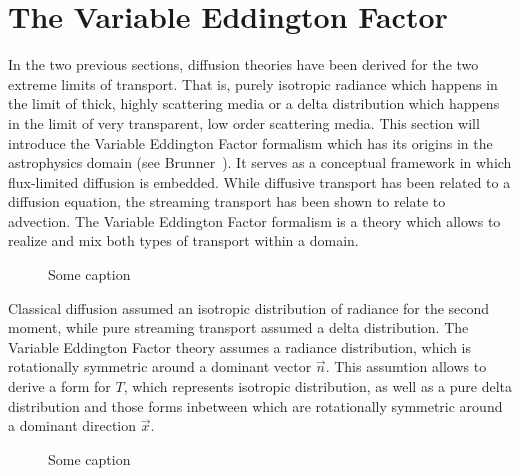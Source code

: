 \section{The Variable Eddington Factor}
\label{sec:fld_vef}

In the two previous sections, diffusion theories have been derived for the two extreme limits of transport. That is, purely isotropic radiance which happens in the limit of thick, highly scattering media or a delta distribution which happens in the limit of very transparent, low order scattering media. This section will introduce the Variable Eddington Factor formalism which has its origins in the astrophysics domain (see Brunner~\cite{Brunner02}). It serves as a conceptual framework in which flux-limited diffusion is embedded. While diffusive transport has been related to a diffusion equation, the streaming transport has been shown to relate to advection. The Variable Eddington Factor formalism is a theory which allows to realize and mix both types of transport within a domain.
\begin{figure}[h]
\centering
{}
\caption{Some caption}
\label{fig:fld_vef_advection_diffusion}
\end{figure}

Classical diffusion assumed an isotropic distribution of radiance for the second moment, while pure streaming transport assumed a delta distribution. The Variable Eddington Factor theory assumes a radiance distribution, which is rotationally symmetric around a dominant vector $\vec{n}$. This assumtion allows to derive a form for $T$, which represents isotropic distribution, as well as a pure delta distribution and those forms inbetween which are rotationally symmetric around a dominant direction $\vec{x}$.
\begin{figure}[h]
\centering
{}
\caption{Some caption}
\label{fig:fld_vef_advection_diffusion}
\end{figure}

